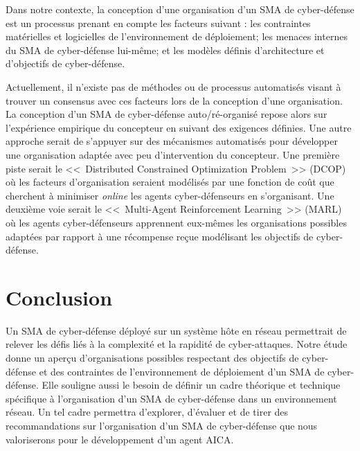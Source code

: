 Dans notre contexte, la conception d'une organisation d'un SMA de cyber-défense est un processus prenant en compte les facteurs suivant : les contraintes matérielles et logicielles de l'environnement de déploiement;
les menaces internes du SMA de cyber-défense lui-même; et les modèles définis d'architecture et d'objectifs de cyber-défense.

Actuellement, il n'existe pas de méthodes ou de processus automatisés visant à trouver un consensus avec ces facteurs lors de la conception d'une organisation.
La conception d'un SMA de cyber-défense auto/ré-organisé repose alors sur l'expérience empirique du concepteur en suivant des exigences définies.
Une autre approche serait de s'appuyer sur des mécanismes automatisés pour développer une organisation adaptée avec peu d'intervention du concepteur.
Une première piste serait le <<~Distributed Constrained Optimization Problem~>> (DCOP) où les facteurs d'organisation seraient modélisés par une fonction de coût que cherchent à minimiser \textit{online} les agents cyber-défenseurs en s'organisant. Une deuxième voie serait le <<~Multi-Agent Reinforcement Learning~>> (MARL) où les agents cyber-défenseurs apprennent eux-mêmes les organisations possibles adaptées par rapport à une récompense reçue modélisant les objectifs de cyber-défense.

\section{Conclusion}
Un SMA de cyber-défense déployé sur un système hôte en réseau permettrait de relever les défis liés à la complexité et la rapidité de cyber-attaques. Notre étude donne un aperçu d'organisations possibles respectant des objectifs de cyber-défense et des contraintes de l'environnement de déploiement d'un SMA de cyber-défense.
Elle souligne aussi le besoin de définir un cadre théorique et technique spécifique à l'organisation d'un SMA de cyber-défense dans un environnement réseau. Un tel cadre permettra d'explorer, d'évaluer et de tirer des recommandations sur l'organisation d'un SMA de cyber-défense que nous valoriserons pour le développement d'un agent AICA.